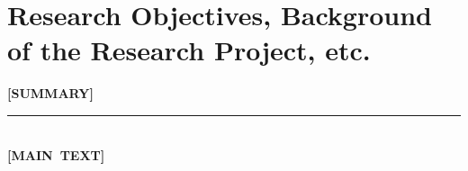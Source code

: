 
\section{Research Objectives, Background of the Research Project, etc.}
\vspace*{-0.8cm}

\noindent
\mbox{\textbf{[SUMMARY]}}\\

\noindent
\rule{\linewidth}{1pt}\\
\noindent
\mbox{\textbf{[MAIN TEXT]}}
\JSPSInstructions	%

%
%
%
%
%
%

